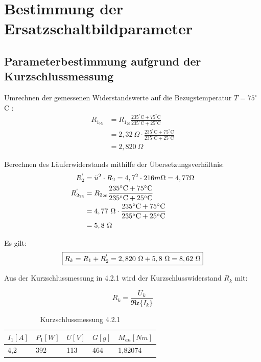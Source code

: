\documentclass[conference]{IEEEtran}
\begin{document}
\section{Bestimmung der Ersatzschaltbildparameter}
\subsection{Parameterbestimmung aufgrund der Kurzschlussmessung}

Umrechnen der gemessenen Widerstandswerte auf die Bezugstemperatur $T=75^\circ$C :
\begin{align*}
    R_{1_{75}} & = R_{1_{20}}\frac{235^\circ\text{C}+75^\circ\text{C}}{235^\circ\text{C}+25^\circ\text{C}}         \\
               & = 2,32\ \Omega\cdot \frac{235^\circ\text{C}+75^\circ\text{C}}{235^\circ\text{C}+25^\circ\text{C}} \\
               & = 2,820\ \Omega
\end{align*}

Berechnen des Läuferwiderstands mithilfe der Übersetzungsverhältnis:
\begin{align*}
    R_2^\text{\textquotesingle}        & = \ddot{u}^2\cdot R_2 = 4,7^2 \cdot 216m\Omega   = 4,77 \Omega                                    \\
    R_{2_{75}}^\text{\textquotesingle} & = R_{2_{20}}\frac{235^\circ\text{C}+75^\circ\text{C}}{235^\circ\text{C}+25^\circ\text{C}}         \\
                                       & = 4,77\ \Omega\cdot \frac{235^\circ\text{C}+75^\circ\text{C}}{235^\circ\text{C}+25^\circ\text{C}} \\
                                       & = 5,8\ \Omega
\end{align*}

Es gilt:
\begin{equation} \label{eq:Kurzschlusswiderstand_gemessen}
    \boxed{R_k = R_1 + R_2^\text{\textquotesingle} = 2,820\ \Omega + 5,8\ \Omega = 8,62\ \Omega}
\end{equation}

Aus der Kurzschlussmessung in 4.2.1 wird der Kurzschlusswiderstand $R_k$ mit:

\begin{equation}
    \boxed{R_k = \frac{U_k}{\mathfrak{Re}\{I_k\}}}
\end{equation}

\begin{table}[htbp]
    \normalsize
    \def\arraystretch{1.5}
    \begin{tabularx}{\columnwidth}{XXXXX}
        \hline
        $I_1[A]$ & $P_1[W]$ & $U[V]$ & $G[g]$ & $M_{an}[Nm]$ \\
        \hline\hline
        4,2      & 392      & 113    & 464    & 1,82074      \\
        \hline
    \end{tabularx}
    \caption{Kurzschlussmessung 4.2.1}
    \label{tab:Kurzschlussmessung}
\end{table}
\end{document}
